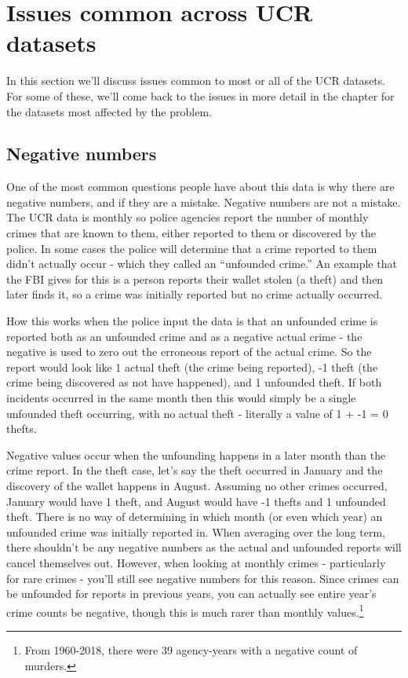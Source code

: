 \documentclass[
  12pt,
  openany]{book}
\begin{document}
\hypertarget{issues-common-across-ucr-datasets}{%
\section{Issues common across UCR datasets}\label{issues-common-across-ucr-datasets}}

In this section we'll discuss issues common to most or all of the UCR datasets. For some of these, we'll come back to the issues in more detail in the chapter for the datasets most affected by the problem.

\hypertarget{negative-numbers}{%
\subsection{Negative numbers}\label{negative-numbers}}

One of the most common questions people have about this data is why there are negative numbers, and if they are a mistake. Negative numbers are not a mistake. The UCR data is monthly so police agencies report the number of monthly crimes that are known to them, either reported to them or discovered by the police. In some cases the police will determine that a crime reported to them didn't actually occur - which they called an ``unfounded crime.'' An example that the FBI gives for this is a person reports their wallet stolen (a theft) and then later finds it, so a crime was initially reported but no crime actually occurred.

How this works when the police input the data is that an unfounded crime is reported both as an unfounded crime and as a negative actual crime - the negative is used to zero out the erroneous report of the actual crime. So the report would look like 1 actual theft (the crime being reported), -1 theft (the crime being discovered as not have happened), and 1 unfounded theft. If both incidents occurred in the same month then this would simply be a single unfounded theft occurring, with no actual theft - literally a value of 1 + -1 = 0 thefts.

Negative values occur when the unfounding happens in a later month than the crime report. In the theft case, let's say the theft occurred in January and the discovery of the wallet happens in August. Assuming no other crimes occurred, January would have 1 theft, and August would have -1 thefts and 1 unfounded theft. There is no way of determining in which month (or even which year) an unfounded crime was initially reported in. When averaging over the long term, there shouldn't be any negative numbers as the actual and unfounded reports will cancel themselves out. However, when looking at monthly crimes - particularly for rare crimes - you'll still see negative numbers for this reason. Since crimes can be unfounded for reports in previous years, you can actually see entire year's crime counts be negative, though this is much rarer than monthly values.\footnote{From 1960-2018, there were 39 agency-years with a negative count of murders.}
\end{document}
